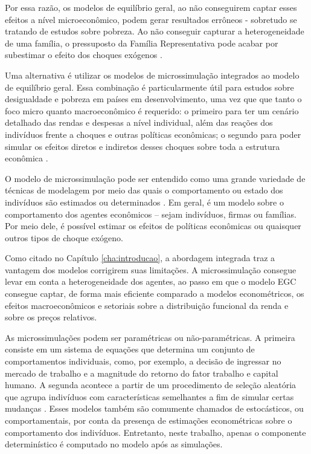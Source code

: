 Por essa razão, os modelos de equilíbrio geral, ao não conseguirem captar esses efeitos a nível microeconômico, podem gerar resultados errôneos - sobretudo se tratando de estudos sobre pobreza. Ao não conseguir capturar a heterogeneidade de uma família, o pressuposto da Família Representativa pode acabar por subestimar o efeito dos choques exógenos \cite{colombo08}. 

Uma alternativa é utilizar os modelos de microssimulação integrados ao modelo de equilíbrio geral. Essa combinação é particularmente útil para estudos sobre desigualdade e pobreza em países em desenvolvimento, uma vez que que tanto o foco micro quanto macroeconômico é requerido: o primeiro para ter um cenário detalhado das rendas e despesas a nível individual, além das reações dos indivíduos frente a choques e outras políticas econômicas; o segundo para poder simular os efeitos diretos e indiretos desses choques sobre toda a estrutura econômica \cite{tiberti17, klevmarken22}.

O modelo de microssimulação pode ser entendido como uma grande variedade de técnicas de modelagem por meio das quais o comportamento ou estado dos indivíduos são estimados ou determinados \cite{figari15}. Em geral, é um modelo sobre o comportamento dos agentes econômicos -- sejam indivíduos, firmas ou famílias. Por meio dele, é possível estimar os efeitos de políticas econômicas ou quaisquer outros tipos de choque exógeno.

Como citado no Capítulo \ref{cha:introducao}, a abordagem integrada traz a vantagem dos modelos corrigirem suas limitações. A microssimulação consegue levar em conta a heterogeneidade dos agentes, ao passo em que o modelo EGC consegue captar, de forma mais eficiente comparado a modelos econométricos, os efeitos macroeconômicos e setoriais sobre a distribuição funcional da renda e sobre os preços relativos.

As microssimulações podem ser paramétricas ou não-paramétricas. A primeira consiste em um sistema de equações que determina um conjunto de comportamentos individuais, como, por exemplo, a decisão de ingressar no mercado de trabalho e a magnitude do retorno do fator trabalho e capital humano. A segunda acontece a partir de um procedimento de seleção aleatória que agrupa indivíduos com características semelhantes a fim de simular certas mudanças \cite{tiberti17m}. Esses modelos também são comumente chamados de estocásticos, ou comportamentais, por conta da presença de estimações econométricas sobre o comportamento dos indivíduos. Entretanto, neste trabalho, apenas o componente determinístico é computado no modelo após as simulações.

